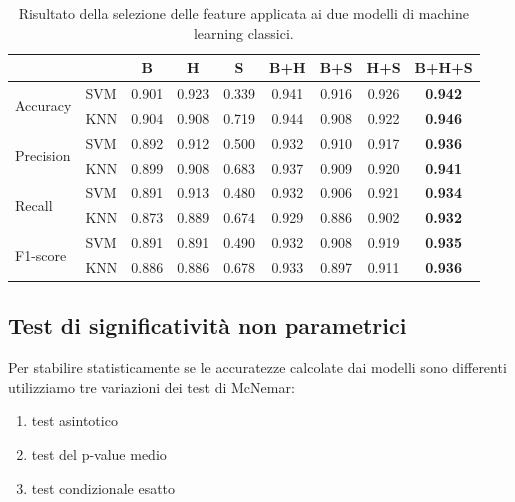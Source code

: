 \begin{table}
    \centering
    \begin{tabular}{l l c c c c c c c}
        \hline
        & & B     & H     & S     & B+H   & B+S   & H+S   & B+H+S \\
        \hline
        \multirow{2}{*}{Accuracy}   & SVM & 0.901 & 0.923 & 0.339 & 0.941 & 0.916 & 0.926 & \textbf{0.942} \\
                                    & KNN & 0.904 & 0.908 & 0.719 & 0.944 & 0.908 & 0.922 & \textbf{0.946} \\
        \hline
        \multirow{2}{*}{Precision}  & SVM & 0.892 & 0.912 & 0.500 & 0.932 & 0.910 & 0.917 & \textbf{0.936} \\      
                                    & KNN & 0.899 & 0.908 & 0.683 & 0.937 & 0.909 & 0.920 & \textbf{0.941} \\
        \hline
        \multirow{2}{*}{Recall}     & SVM & 0.891 & 0.913 & 0.480 & 0.932 & 0.906 & 0.921 & \textbf{0.934} \\
                                    & KNN & 0.873 & 0.889 & 0.674 & 0.929 & 0.886 & 0.902 & \textbf{0.932} \\
        \hline
        \multirow{2}{*}{F1-score}   & SVM & 0.891 & 0.891 & 0.490 & 0.932 & 0.908 & 0.919 & \textbf{0.935} \\
                                    & KNN & 0.886 & 0.886 & 0.678 & 0.933 & 0.897 & 0.911 & \textbf{0.936} \\
        \hline
    \end{tabular}
    \caption{Risultato della selezione delle feature applicata ai due modelli di machine learning classici.}
    \label{tab:features}
\end{table}

\subsection{Test di significatività non parametrici}
\label{ssec:tesi-di-significativita-non-parametrici}

Per stabilire statisticamente se le accuratezze calcolate dai modelli sono differenti utilizziamo tre variazioni dei test di McNemar\cite{fagerland2013mcnemar}:

\begin{enumerate}
    \item test asintotico
    \item test del p-value medio
    \item test condizionale esatto
\end{enumerate}

